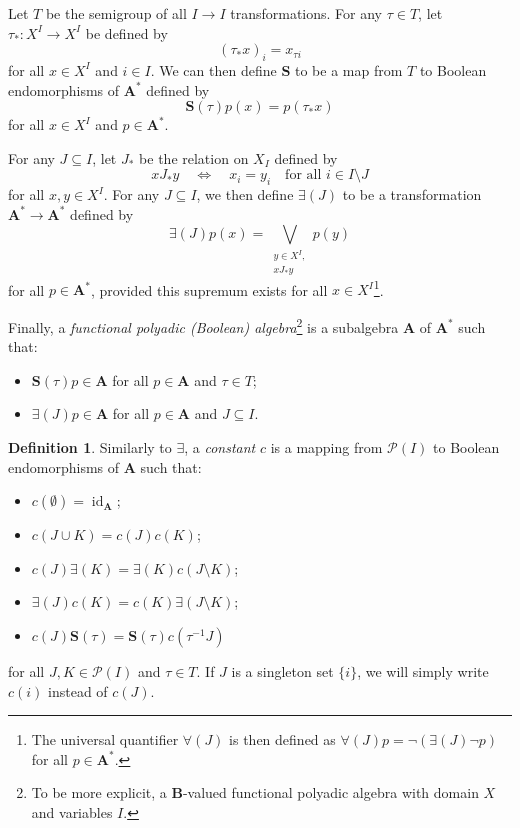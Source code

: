 \documentclass{article}
\theoremstyle{definition}
\newtheorem{definition}{Definition}
\theoremstyle{remark}
\DeclareMathOperator{\id}{id}
\begin{document}
Let $T$ be the semigroup of all $I \to I$ transformations. For any $\tau \in
T$, let $\tau_* : X^I \to X^I$ be defined by
\[
  (\tau_* x)_i = x_{\tau i}
\]
for all $x \in X^I$ and $i \in I$. We can then define $\mathbf{S}$ to be a map
from $T$ to Boolean endomorphisms of $\mathbf{A^*}$ defined by
\[
  \mathbf{S}(\tau)p(x) = p(\tau_* x)
\]
for all $x \in X^I$ and $p \in \mathbf{A^*}$.

For any $J \subseteq I$, let $J_*$ be the relation on $X_I$ defined by
\[
  xJ_*y \quad \iff \quad x_i = y_i \quad \text{for all } i \in I \setminus J
\]
for all $x, y \in X^I$. For any $J \subseteq I$, we then define $\bm\exists(J)$
to be a transformation $\mathbf{A^*} \to \mathbf{A^*}$ defined by
\[
  \bm\exists(J)p(x) = \bigvee_{\substack{y \in X^I,\\ xJ_*y}} p(y)
\]
for all $p \in \mathbf{A^*}$, provided this supremum exists for all $x \in
X^I$\footnote{The universal quantifier $\bm\forall(J)$ is then defined as
  $\bm\forall(J)p = \neg(\bm\exists(J)\neg p)$ for all $p \in \mathbf{A^*}$.}.

Finally, a \emph{functional polyadic (Boolean) algebra}\footnote{To be more
  explicit, a $\mathbf{B}$-valued functional polyadic algebra with domain $X$
  and variables $I$.} is a subalgebra
$\mathbf{A}$ of $\mathbf{A^*}$ such that:
\begin{itemize}
\item $\mathbf{S}(\tau)p \in \mathbf{A}$ for all $p \in \mathbf{A}$ and $\tau
  \in T$;
\item $\bm\exists(J)p \in \mathbf{A}$ for all $p \in \mathbf{A}$ and $J
  \subseteq I$.
\end{itemize}

\begin{definition}
  Similarly to $\bm\exists$, a \emph{constant} $c$ is a mapping from
  $\mathcal{P}(I)$ to Boolean endomorphisms of $\mathbf{A}$ such that:
  \begin{itemize}
  \item $c(\emptyset) = \id_{\mathbf{A}}$;
  \item $c(J \cup K) = c(J)c(K)$;
  \item $c(J)\bm\exists(K) = \bm\exists(K)c(J \setminus K)$;
  \item $\bm\exists(J)c(K) = c(K)\bm\exists(J \setminus K)$;
  \item $c(J)\mathbf{S}(\tau) = \mathbf{S}(\tau)c(\tau^{-1}J)$
  \end{itemize}
  for all $J, K \in \mathcal{P}(I)$ and $\tau \in T$. If $J$ is a singleton
  set $\{ i \}$, we will simply write $c(i)$ instead of $c(J)$.
\end{definition}
\end{document}
